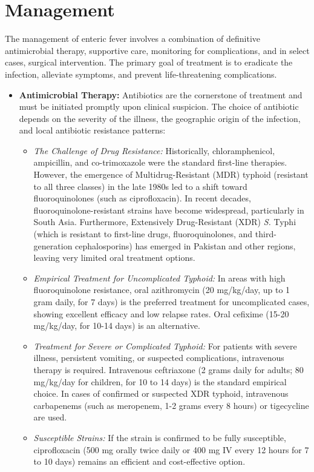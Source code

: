 \section*{Management}
The management of enteric fever involves a combination of definitive antimicrobial therapy, supportive care, monitoring for complications, and in select cases, surgical intervention. The primary goal of treatment is to eradicate the infection, alleviate symptoms, and prevent life-threatening complications.

\begin{itemize}
\item \textbf{Antimicrobial Therapy:} Antibiotics are the cornerstone of treatment and must be initiated promptly upon clinical suspicion. The choice of antibiotic depends on the severity of the illness, the geographic origin of the infection, and local antibiotic resistance patterns:
  \begin{itemize}
  \item \textit{The Challenge of Drug Resistance:} Historically, chloramphenicol, ampicillin, and co-trimoxazole were the standard first-line therapies. However, the emergence of Multidrug-Resistant (MDR) typhoid (resistant to all three classes) in the late 1980s led to a shift toward fluoroquinolones (such as ciprofloxacin). In recent decades, fluoroquinolone-resistant strains have become widespread, particularly in South Asia. Furthermore, Extensively Drug-Resistant (XDR) \textit{S.} Typhi (which is resistant to first-line drugs, fluoroquinolones, and third-generation cephalosporins) has emerged in Pakistan and other regions, leaving very limited oral treatment options.
  \item \textit{Empirical Treatment for Uncomplicated Typhoid:} In areas with high fluoroquinolone resistance, oral azithromycin (20 mg/kg/day, up to 1 gram daily, for 7 days) is the preferred treatment for uncomplicated cases, showing excellent efficacy and low relapse rates. Oral cefixime (15-20 mg/kg/day, for 10-14 days) is an alternative.
  \item \textit{Treatment for Severe or Complicated Typhoid:} For patients with severe illness, persistent vomiting, or suspected complications, intravenous therapy is required. Intravenous ceftriaxone (2 grams daily for adults; 80 mg/kg/day for children, for 10 to 14 days) is the standard empirical choice. In cases of confirmed or suspected XDR typhoid, intravenous carbapenems (such as meropenem, 1-2 grams every 8 hours) or tigecycline are used.
  \item \textit{Susceptible Strains:} If the strain is confirmed to be fully susceptible, ciprofloxacin (500 mg orally twice daily or 400 mg IV every 12 hours for 7 to 10 days) remains an efficient and cost-effective option.

\end{itemize}
\end{itemize}
